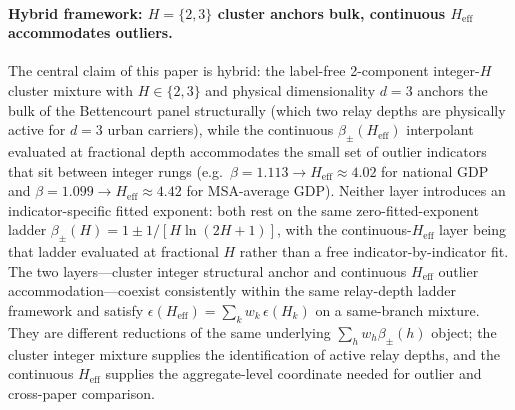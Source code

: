 \paragraph{Hybrid framework: \(H{=}\{2,3\}\) cluster anchors bulk, continuous \(H_{\mathrm{eff}}\) accommodates outliers.}
The central claim of this paper is hybrid: the label-free 2-component
integer-\(H\) cluster mixture with \(H\in\{2,3\}\) and physical
dimensionality \(d=3\) anchors the bulk of the Bettencourt panel
structurally (which two relay depths are physically active for $d{=}3$
urban carriers), while the continuous \(\beta_{\pm}(H_{\mathrm{eff}})\)
interpolant evaluated at fractional depth accommodates the small set of
outlier indicators that sit between integer rungs (e.g.\
\(\beta=1.113\to H_{\mathrm{eff}}\approx 4.02\) for national GDP and
\(\beta=1.099\to H_{\mathrm{eff}}\approx 4.42\) for MSA-average GDP).
Neither layer introduces an indicator-specific fitted exponent: both rest
on the same zero-fitted-exponent ladder \(\beta_{\pm}(H)=1\pm 1/[H\ln(2H+1)]\),
with the continuous-\(H_{\mathrm{eff}}\) layer being that ladder
evaluated at fractional \(H\) rather than a free indicator-by-indicator
fit. The two layers---cluster integer structural anchor and continuous
\(H_{\mathrm{eff}}\) outlier accommodation---coexist consistently within
the same relay-depth ladder framework and satisfy
\(\epsilon(H_{\mathrm{eff}})=\sum_k w_k\,\epsilon(H_k)\) on a same-branch
mixture. They are different reductions of the same underlying
\(\sum_h w_h\beta_{\pm}(h)\) object; the cluster integer mixture supplies
the identification of active relay depths, and the continuous
\(H_{\mathrm{eff}}\) supplies the aggregate-level coordinate needed for
outlier and cross-paper comparison.

